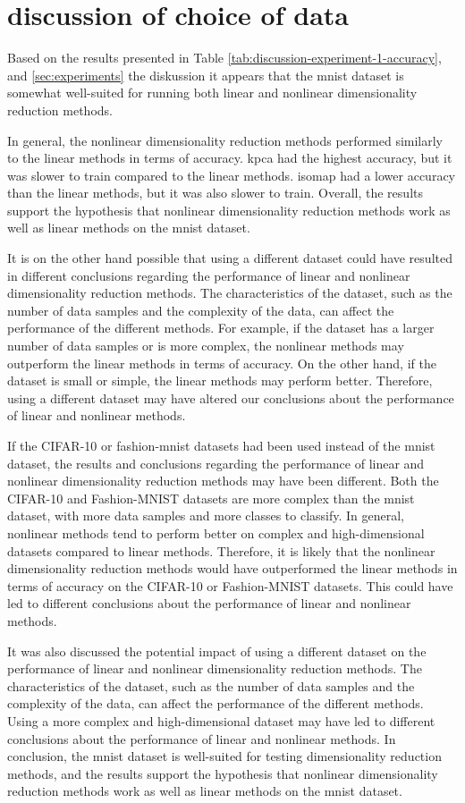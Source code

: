 \section{discussion of choice of data}
Based on the results presented in Table \ref{tab:discussion-experiment-1-accuracy}, and \ref{sec:experiments} the diskussion it appears that the \gls{mnist} dataset is somewhat well-suited for running both linear and nonlinear dimensionality reduction methods.  

In general, the nonlinear dimensionality reduction methods performed similarly to the linear methods in terms of accuracy. \gls{kpca} had the highest accuracy, but it was slower to train compared to the linear methods. \gls{isomap} had a lower accuracy than the linear methods, but it was also slower to train. Overall, the results support the hypothesis that nonlinear dimensionality reduction methods work as well as linear methods on the \gls{mnist} dataset.

It is on the other hand possible that using a different dataset could have resulted in different conclusions regarding the performance of linear and nonlinear dimensionality reduction methods. The characteristics of the dataset, such as the number of data samples and the complexity of the data, can affect the performance of the different methods. For example, if the dataset has a larger number of data samples or is more complex, the nonlinear methods may outperform the linear methods in terms of accuracy. On the other hand, if the dataset is small or simple, the linear methods may perform better. Therefore, using a different dataset may have altered our conclusions about the performance of linear and nonlinear methods.

If the CIFAR-10 or \gls{fashion-mnist} datasets had been used instead of the \gls{mnist} dataset, the results and conclusions regarding the performance of linear and nonlinear dimensionality reduction methods may have been different. Both the CIFAR-10 and Fashion-MNIST datasets are more complex than the \gls{mnist} dataset, with more data samples and more classes to classify. In general, nonlinear methods tend to perform better on complex and high-dimensional datasets compared to linear methods. Therefore, it is likely that the nonlinear dimensionality reduction methods would have outperformed the linear methods in terms of accuracy on the CIFAR-10 or Fashion-MNIST datasets. This could have led to different conclusions about the performance of linear and nonlinear methods.

It was also discussed the potential impact of using a different dataset on the performance of linear and nonlinear dimensionality reduction methods. The characteristics of the dataset, such as the number of data samples and the complexity of the data, can affect the performance of the different methods. Using a more complex and high-dimensional dataset may have led to different conclusions about the performance of linear and nonlinear methods. In conclusion, the \gls{mnist} dataset is well-suited for testing dimensionality reduction methods, and the results support the hypothesis that nonlinear dimensionality reduction methods work as well as linear methods on the \gls{mnist} dataset.